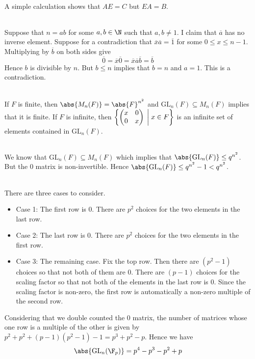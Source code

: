 \documentclass[a4paper]{article}
\begin{document}
\begin{ex}{}{}\\
A simple calculation shows that $AE=C$ but $EA=B$. 
\end{ex}

\begin{ex}{}{}\\
Suppose that $n=ab$ for some $a,b\in\N$ such that $a,b\neq 1$. I claim that $\overline{a}$ has no inverse element. Suppose for a contradiction that $\overline{x}\overline{a}=\overline{1}$ for some $0\leq x\leq n-1$. Multiplying by $\overline{b}$ on both sides give $$\overline{0}=\overline{x}\overline{0}=\overline{x}\overline{a}\overline{b}=\overline{b}$$ Hence $b$ is divisible by $n$. But $b\leq n$ implies that $b=n$ and $a=1$. This is a contradiction. 
\end{ex}

\begin{ex}{}{}\\
If $F$ is finite, then $\abs{M_n(F)}=\abs{F}^{n^2}$ and $\text{GL}_n(F)\subseteq M_n(F)$ implies that it is finite. If $F$ is infinite, then $\left\{\begin{pmatrix}
x & 0\\
0 & x
\end{pmatrix}\;\bigg{|}\;x\in F\right\}$ is an infinite set of elements contained in $\text{GL}_n(F)$. 
\end{ex}

\begin{ex}{}{}\\
We know that $\text{GL}_n(F)\subseteq M_n(F)$ which implies that $\abs{\text{GL}_n(F)}\leq q^{n^2}$. But the $0$ matrix is non-invertible. Hence $\abs{\text{GL}_n(F)}\leq q^{n^2}-1<q^{n^2}$. 
\end{ex}

\begin{ex}{}{}\\
There are three cases to consider. 
\begin{itemize}
\item Case 1: The first row is $0$. There are $p^2$ choices for the two elements in the last row. 
\item Case 2: The last row is $0$. There are $p^2$ choices for the two elements in the first row. 
\item Case 3: The remaining case. Fix the top row. Then there are $(p^2-1)$ choices so that not both of them are $0$. There are $(p-1)$ choices for the scaling factor so that not both of the elements in the last row is $0$. Since the scaling factor is non-zero, the first row is automatically a non-zero multiple of the second row. 
\end{itemize}
Considering that we double counted the $0$ matrix, the number of matrices whose one row is a multiple of the other is given by $p^2+p^2+(p-1)(p^2-1)-1=p^3+p^2-p$. Hence we have $$\abs{\text{GL}_n(\F_p)}=p^4-p^3-p^2+p$$
\end{ex}
\end{document}
